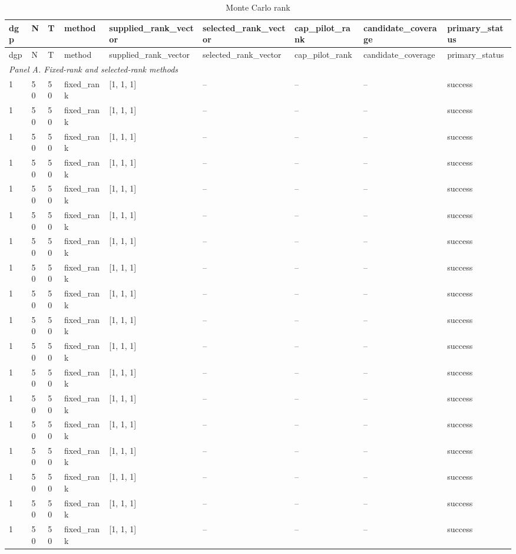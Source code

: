 \begingroup
\small
\begin{longtable}{lllllllll}
\caption{Monte Carlo rank}\label{tab:mc-rank}\\
\toprule
dgp & N & T & method & supplied\_rank\_vector & selected\_rank\_vector & cap\_pilot\_rank & candidate\_coverage & primary\_status \\
\midrule
\endfirsthead
\toprule
dgp & N & T & method & supplied\_rank\_vector & selected\_rank\_vector & cap\_pilot\_rank & candidate\_coverage & primary\_status \\
\midrule
\endhead
\multicolumn{9}{l}{\textit{Panel A. Fixed-rank and selected-rank methods}} \\
1 & 50 & 50 & fixed\_rank & [1, 1, 1] & -- & -- & -- & success \\
1 & 50 & 50 & fixed\_rank & [1, 1, 1] & -- & -- & -- & success \\
1 & 50 & 50 & fixed\_rank & [1, 1, 1] & -- & -- & -- & success \\
1 & 50 & 50 & fixed\_rank & [1, 1, 1] & -- & -- & -- & success \\
1 & 50 & 50 & fixed\_rank & [1, 1, 1] & -- & -- & -- & success \\
1 & 50 & 50 & fixed\_rank & [1, 1, 1] & -- & -- & -- & success \\
1 & 50 & 50 & fixed\_rank & [1, 1, 1] & -- & -- & -- & success \\
1 & 50 & 50 & fixed\_rank & [1, 1, 1] & -- & -- & -- & success \\
1 & 50 & 50 & fixed\_rank & [1, 1, 1] & -- & -- & -- & success \\
1 & 50 & 50 & fixed\_rank & [1, 1, 1] & -- & -- & -- & success \\
1 & 50 & 50 & fixed\_rank & [1, 1, 1] & -- & -- & -- & success \\
1 & 50 & 50 & fixed\_rank & [1, 1, 1] & -- & -- & -- & success \\
1 & 50 & 50 & fixed\_rank & [1, 1, 1] & -- & -- & -- & success \\
1 & 50 & 50 & fixed\_rank & [1, 1, 1] & -- & -- & -- & success \\
1 & 50 & 50 & fixed\_rank & [1, 1, 1] & -- & -- & -- & success \\
1 & 50 & 50 & fixed\_rank & [1, 1, 1] & -- & -- & -- & success \\
1 & 50 & 50 & fixed\_rank & [1, 1, 1] & -- & -- & -- & success \\
1 & 50 & 50 & fixed\_rank & [1, 1, 1] & -- & -- & -- & success \\

\end{longtable}
